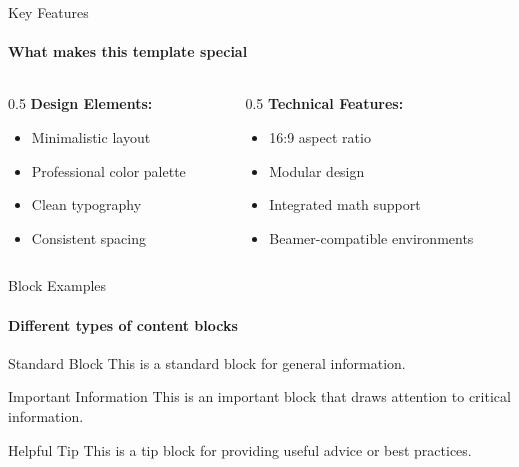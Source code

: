 \documentclass[aspectratio=169]{beamer}
\begin{document}
\begin{frame}{Key Features}
    \framesubtitle{What makes this template special}
    
    \begin{columns}[T]
        \begin{column}{0.5\textwidth}
            \textbf{Design Elements:}
            \begin{itemize}
                \item Minimalistic layout
                \item Professional color palette
                \item Clean typography
                \item Consistent spacing
            \end{itemize}
        \end{column}
        \begin{column}{0.5\textwidth}
            \textbf{Technical Features:}
            \begin{itemize}
                \item 16:9 aspect ratio
                \item Modular design
                \item Integrated math support
                \item Beamer-compatible environments
            \end{itemize}
        \end{column}
    \end{columns}
\end{frame}

\begin{frame}{Block Examples}
    \framesubtitle{Different types of content blocks}
    
    \begin{block}{Standard Block}
        This is a standard block for general information.
    \end{block}
    
    \begin{importantblock}{Important Information}
        This is an important block that draws attention to critical information.
    \end{importantblock}
    
    \begin{tipblock}{Helpful Tip}
        This is a tip block for providing useful advice or best practices.
    \end{tipblock}
\end{frame}
\end{document}
